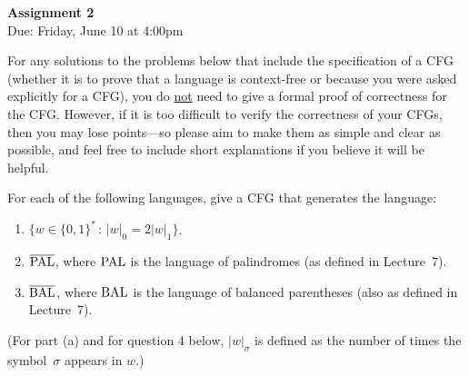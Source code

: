 \documentclass[11pt]{article}
\newcommand{\abs}[1]{\lvert #1 \rvert}
\newenvironment{mylist}[1]{\begin{list}{}{
	\setlength{\leftmargin}{#1}
	\setlength{\rightmargin}{0mm}
	\setlength{\labelsep}{2mm}
	\setlength{\labelwidth}{8mm}
	\setlength{\itemsep}{0mm}}}
	{\end{list}}
\newcounter{questioncounter}
\newenvironment{question}{
  \begin{mylist}{\parindent}
  \item[\stepcounter{questioncounter}
    \thequestioncounter.]}{
\end{mylist}}
\begin{document}
\pagestyle{plain}
\thispagestyle{fancy}
\cfoot{\thepage} 
\renewcommand{\headrulewidth}{0pt}
\renewcommand{\footrulewidth}{0pt}

\begin{center}
  \rule{0mm}{9mm}
  {\Large\bf Assignment 2}\\[2mm]
  Due: Friday, June 10 at 4:00pm
\end{center}

For any solutions to the problems below that include the specification of a
CFG (whether it is to prove that a language is context-free or because you were
asked explicitly for a CFG), you do \underline{not} need to give a formal proof
of correctness for the CFG.
However, if it is too difficult to verify the correctness of your CFGs,
then you may lose points---so please aim to make them as simple and clear as
possible, and feel free to include short explanations if you believe it will
be helpful.


\begin{question}[6 points]
  For each of the following languages, give a CFG that generates the language:
  
  \begin{enumerate}
  \item[(a)]
    $\bigl\{w\in\{0,1\}^{\ast}\,:\,\abs{w}_0 = 2\abs{w}_1\bigr\}$.
  \item[(b)]
    $\overline{\textup{PAL}}$, where $\textup{PAL}$ is the language of
    palindromes (as defined in Lecture~7).
  \item[(c)]
    $\overline{\textup{BAL}}$, where $\textup{BAL}$ is the language of
    balanced parentheses (also as defined in Lecture~7).
  \end{enumerate}

  (For part (a) and for question 4 below, $\abs{w}_\sigma$ is defined as
  the number of times the symbol~$\sigma$ appears in $w$.)
\end{question}

\end{document}
